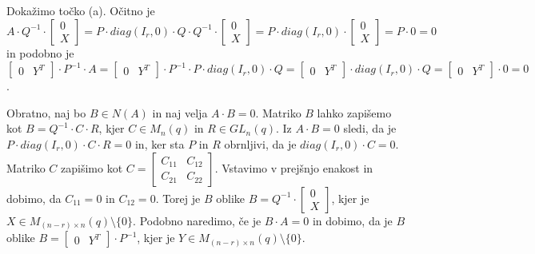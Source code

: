 \documentclass[mat1, tisk]{fmfdelo}
\begin{document}
\begin{dokaz}
  Dokažimo točko (a). Očitno je $A \cdot Q^{-1} \cdot 
  \begin{bmatrix}
    0 \\
    X
  \end{bmatrix} = P \cdot diag(I_r, 0) \cdot Q \cdot Q^{-1} \cdot 
  \begin{bmatrix}
    0 \\
    X
  \end{bmatrix} = P \cdot diag(I_r, 0) \cdot 
  \begin{bmatrix}
    0 \\
    X
  \end{bmatrix} = P \cdot 0 = 0$ in podobno je 
  $\begin{bmatrix}
    0 & Y^T
  \end{bmatrix} \cdot P^{-1} \cdot A = 
  \begin{bmatrix}
    0 & Y^T
  \end{bmatrix} \cdot P^{-1} \cdot P \cdot diag(I_r, 0) \cdot Q = 
  \begin{bmatrix}
    0 & Y^T
  \end{bmatrix} \cdot diag(I_r, 0) \cdot Q = 
  \begin{bmatrix}
    0 & Y^T
  \end{bmatrix} \cdot 0 = 0$. 
  
  Obratno, naj bo $B \in N(A)$ in naj velja 
  $A \cdot B = 0$. Matriko $B$ lahko zapišemo kot $B = Q^{-1} \cdot C \cdot R$, 
  kjer $C \in M_n(q)$ in $R \in GL_n (q)$. Iz $A \cdot B = 0$ sledi, da je 
  $P \cdot diag(I_r, 0) \cdot C \cdot R = 0$ in, ker sta $P$ in $R$ obrnljivi, da 
  je $diag(I_r, 0) \cdot C = 0$. Matriko $C$ zapišimo kot 
  $C =  
  \begin{bmatrix}
    C_{11} & C_{12} \\
    C_{21} & C_{22}
  \end{bmatrix}$. Vstavimo v prejšnjo enakost in dobimo, da $C_{11} = 0$ in $C_{12} = 0$. 
  Torej je $B$ oblike $B = Q^{-1} \cdot 
  \begin{bmatrix}
    0 \\
    X
  \end{bmatrix}$, kjer je $X \in M_{(n-r) \times n}(q)\setminus\{0\}$. Podobno naredimo, 
  če je $B \cdot A = 0$ in dobimo, da je $B$ oblike $B = 
  \begin{bmatrix}
    0 & Y^T
  \end{bmatrix} \cdot P^{-1}$, kjer je $Y \in M_{(n-r) \times n}(q)\setminus\{0\}$.



\end{dokaz}
\end{document}
